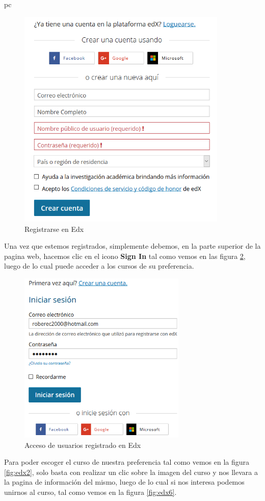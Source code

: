 pc\documentclass[a4paper,12pt,openany]{book}
\begin{document}
\begin{figure}[H]
  \centering
	\includegraphics[width=10cm]{edx3.png}
\caption{Registrarse en Edx}
  \label{fig:edx4}
\end{figure}

 Una vez que estemos registrados, simplemente debemos, en la parte superior de la pagina web, hacemos clic en el icono \textbf{Sign In} tal como vemos en las figura \ref{fig:edx5}, luego de lo cual puede acceder a los cursos de su preferencia.

\begin{figure}[H]
  \centering
	\includegraphics[width=8cm]{edx4.png}
\caption{Acceso de usuarios registrado en Edx}
  \label{fig:edx5}
\end{figure}

Para poder escoger el curso de nuestra preferencia tal como vemos en la figura \ref{fig:edx2}, solo basta con realizar un clic sobre la imagen del curso y nos llevara a la pagina de información del mismo, luego de lo cual si nos interesa podemos unirnos al curso, tal como vemos en la figura \ref{fig:edx6}.\
\end{document}
